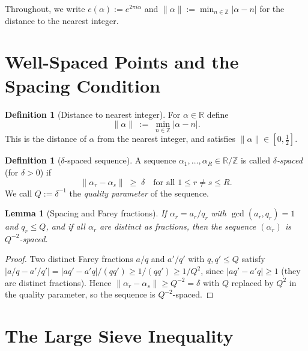 \documentclass[12pt,a4paper]{amsart}
\newtheorem{lemma}[theorem]{Lemma}
\theoremstyle{definition}
\newtheorem{definition}[theorem]{Definition}
\newcommand{\Z}{\mathbb{Z}}
\newcommand{\R}{\mathbb{R}}
\newcommand{\eexp}[1]{e\!\left(#1\right)}
\begin{document}
Throughout, we write $\eexp{\alpha} := e^{2\pi i\alpha}$ and
$\|\alpha\| := \min_{n\in\Z}|\alpha - n|$ for the distance to the nearest
integer.

\section{Well-Spaced Points and the Spacing Condition}

\begin{definition}[Distance to nearest integer]
  For $\alpha \in \R$ define
  \[
    \|\alpha\| \;:=\; \min_{n \in \Z}|\alpha - n|.
  \]
  This is the distance of $\alpha$ from the nearest integer, and satisfies
  $\|\alpha\| \in [0, \tfrac{1}{2}]$.
\end{definition}

\begin{definition}[$\delta$-spaced sequence]\label{def:spaced}
  A sequence $\alpha_1, \ldots, \alpha_R \in \R/\Z$ is called
  \emph{$\delta$-spaced} (for $\delta > 0$) if
  \[
    \|\alpha_r - \alpha_s\| \;\geq\; \delta
    \quad \text{for all } 1 \leq r \neq s \leq R.
  \]
  We call $Q := \delta^{-1}$ the \emph{quality parameter} of the sequence.
\end{definition}

\begin{lemma}[Spacing and Farey fractions]\label{lem:farey}
  If $\alpha_r = a_r/q_r$ with $\gcd(a_r, q_r) = 1$ and $q_r \leq Q$,
  and if all $\alpha_r$ are distinct as fractions, then the sequence
  $(\alpha_r)$ is $Q^{-2}$-spaced.
\end{lemma}

\begin{proof}
  Two distinct Farey fractions $a/q$ and $a'/q'$ with $q, q' \leq Q$
  satisfy $|a/q - a'/q'| = |aq' - a'q|/(qq') \geq 1/(qq') \geq 1/Q^2$,
  since $|aq'-a'q| \geq 1$ (they are distinct fractions).
  Hence $\|\alpha_r - \alpha_s\| \geq Q^{-2} = \delta$ with $Q$ replaced
  by $Q^2$ in the quality parameter, so the sequence is $Q^{-2}$-spaced.
\end{proof}

\section{The Large Sieve Inequality}
\end{document}
